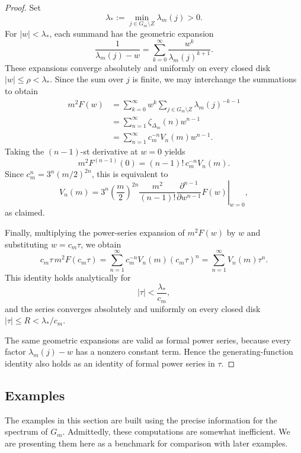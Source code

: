 \documentclass[11pt,reqno]{amsart}
\theoremstyle{remark}
\begin{document}
\begin{proof}
Set
\[
\lambda_*:=\min_{j\in G_m\setminus Z}\lambda_m(j)>0.
\]
For \(|w|<\lambda_*\), each summand has the geometric expansion
\[
\frac{1}{\lambda_m(j)-w}
=
\sum_{k=0}^{\infty}
\frac{w^k}{\lambda_m(j)^{k+1}}.
\]
These expansions converge absolutely and uniformly on every
closed disk \(|w|\leq\rho<\lambda_*\).
Since the sum over \(j\) is finite, we may interchange the
summations to obtain
\begin{align*}
m^2F(w)
&=
\sum_{k=0}^{\infty}
w^k
\sum_{j\in G_m\setminus Z}\lambda_m(j)^{-k-1} \\
&=
\sum_{n=1}^{\infty}
\zeta_{\Delta_m}(n)w^{n-1} \\
&=
\sum_{n=1}^{\infty}
c_m^{-n}V_n(m)w^{n-1}.
\end{align*}
Taking the \((n-1)\)-st derivative at \(w=0\) yields
\[
m^2F^{(n-1)}(0)
=
(n-1)!\,c_m^{-n}V_n(m).
\]
Since \(c_m^n=3^n(m/2)^{2n}\), this is equivalent to
\[
V_n(m)
=
3^n\left(\frac{m}{2}\right)^{2n}
\frac{m^2}{(n-1)!}
\left.
\frac{\partial^{n-1}}{\partial w^{n-1}}F(w)
\right|_{w=0},
\]
as claimed.

Finally, multiplying the power-series expansion of \(m^2F(w)\)
by \(w\) and substituting \(w=c_m\tau\), we obtain
\[
c_m\tau\,m^2F(c_m\tau)
=
\sum_{n=1}^{\infty}
c_m^{-n}V_n(m)(c_m\tau)^n
=
\sum_{n=1}^{\infty}V_n(m)\tau^n.
\]
This identity holds analytically for
\[
|\tau|<\frac{\lambda_*}{c_m},
\]
and the series converges absolutely and uniformly on every
closed disk \(|\tau|\leq R<\lambda_*/c_m\).

The same geometric expansions are valid as formal power series,
because every factor \(\lambda_m(j)-w\) has a nonzero constant
term. Hence the generating-function identity also holds as an
identity of formal power series in \(\tau\).
\end{proof}

\subsection{Examples}
\label{sec:examples}

The examples in this section are built using the precise information for the
spectrum of $G_{m}$.  Admittedly, these computations are somewhat inefficient.  We are presenting them
here as a benchmark for comparison with later examples.
\end{document}
